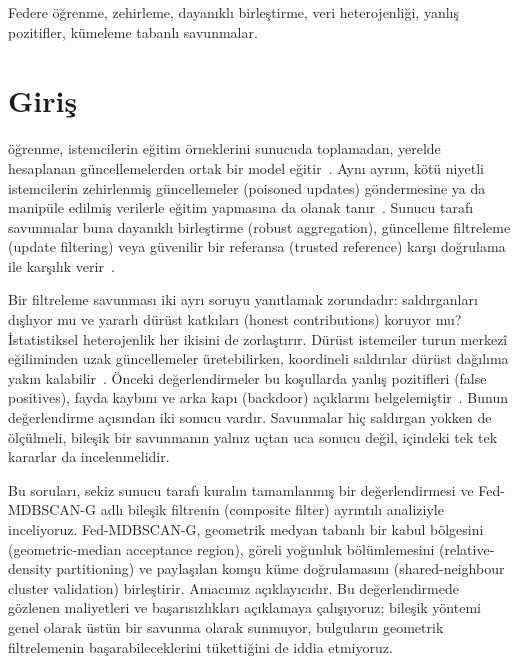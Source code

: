 \documentclass[journal]{IEEEtran}
\newcommand{\method}{Fed-MDBSCAN-G}
\begin{document}
\begin{IEEEkeywords}
Federe öğrenme, zehirleme, dayanıklı birleştirme, veri heterojenliği, yanlış pozitifler, kümeleme tabanlı savunmalar.
\end{IEEEkeywords}
\IEEEpeerreviewmaketitle

\section{Giriş}
 öğrenme, istemcilerin eğitim örneklerini sunucuda toplamadan, yerelde hesaplanan güncellemelerden ortak bir model eğitir~\cite{mcmahan2017}. Aynı ayrım, kötü niyetli istemcilerin zehirlenmiş güncellemeler (poisoned updates) göndermesine ya da manipüle edilmiş verilerle eğitim yapmasına da olanak tanır~\cite{fang2020,bagdasaryan2020,xie2020dba}. Sunucu tarafı savunmalar buna dayanıklı birleştirme (robust aggregation), güncelleme filtreleme (update filtering) veya güvenilir bir referansa (trusted reference) karşı doğrulama ile karşılık verir~\cite{blanchard2017,yin2018,cao2021fltrust,nguyen2022flame}.

Bir filtreleme savunması iki ayrı soruyu yanıtlamak zorundadır: saldırganları dışlıyor mu ve yararlı dürüst katkıları (honest contributions) koruyor mu? İstatistiksel heterojenlik her ikisini de zorlaştırır. Dürüst istemciler turun merkezî eğiliminden uzak güncellemeler üretebilirken, koordineli saldırılar dürüst dağılıma yakın kalabilir~\cite{baruch2019,shejwalkar2021}. Önceki değerlendirmeler bu koşullarda yanlış pozitifleri (false positives), fayda kaybını ve arka kapı (backdoor) açıklarını belgelemiştir~\cite{singh2023fair,ye2025illusion,bellachia2026sok}. Bunun değerlendirme açısından iki sonucu vardır. Savunmalar hiç saldırgan yokken de ölçülmeli, bileşik bir savunmanın yalnız uçtan uca sonucu değil, içindeki tek tek kararlar da incelenmelidir.

Bu soruları, sekiz sunucu tarafı kuralın tamamlanmış bir değerlendirmesi ve \method{} adlı bileşik filtrenin (composite filter) ayrıntılı analiziyle inceliyoruz. \method{}, geometrik medyan tabanlı bir kabul bölgesini (geometric-median acceptance region), göreli yoğunluk bölümlemesini (relative-density partitioning) ve paylaşılan komşu küme doğrulamasını (shared-neighbour cluster validation) birleştirir. Amacımız açıklayıcıdır. Bu değerlendirmede gözlenen maliyetleri ve başarısızlıkları açıklamaya çalışıyoruz; bileşik yöntemi genel olarak üstün bir savunma olarak sunmuyor, bulguların geometrik filtrelemenin başarabileceklerini tükettiğini de iddia etmiyoruz.
\end{document}
